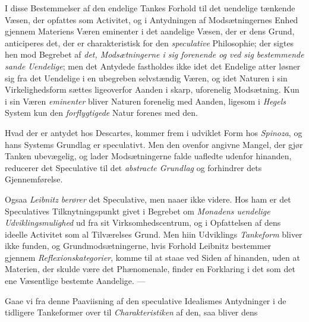 I disse Bestemmelser af den endelige Tankes Forhold til
det uendelige tænkende Væsen, der opfattes som Activitet, og i
Antydningen af Modsætningernes Enhed gjennem Materiens
Væren eminenter i det aandelige Væsen, der er dens Grund,
anticiperes det, der er charakteristisk for den \emph{speculative}
Philosophie; der sigtes hen mod Begrebet af \emph{det, Modsætningerne
i sig forenende og ved sig bestemmende
sande Uendelige}; men det Antydede fastholdes ikke idet
det Endelige atter løsner sig fra det Uendelige i en ubegreben
selvstændig Væren, og idet Naturen i sin Virkelighedsform
sættes ligeoverfor Aanden i skarp, uforenelig Modsætning. Kun
i sin Væren \emph{eminenter} bliver Naturen forenelig med Aanden,
ligesom i \emph{Hegels} System kun den \emph{forflygtigede} Natur forenes
med den.

Hvad der er antydet hos Descartes, kommer frem i udviklet
Form hos \emph{Spinoza}, og hans Systems Grundlag er speculativt.
Men den ovenfor angivne Mangel, der gjør Tanken
ubevægelig, og lader Modsætningerne falde uafledte udenfor
hinanden, reducerer det Speculative til det \emph{abstracte Grundlag}
og forhindrer dets Gjennemførelse.

Ogsaa \emph{Leibnitz berører} det Speculative, men naaer
ikke videre. Hos ham er det Speculatives Tilknytningspunkt
givet i Begrebet om \emph{Monadens uendelige Udviklingsmulighed}
ud fra sit Virksomhedscentrum, og i Opfattelsen af
dens ideelle Activitet som al Tilværelses Grund. Men hiin
Udviklings \emph{Tankeform} bliver ikke funden, og Grundmodsætningerne,
hvis Forhold Leibnitz bestemmer gjennem \emph{Reflexionskategorier},
komme til at staae ved Siden af hinanden,
uden at Materien, der skulde være det Phænomenale,
 finder en Forklaring i det som det ene Væsentlige bestemte
Aandelige. ---

Gaae vi fra denne Paaviisning af den speculative Idealismes
Antydninger i de tidligere Tankeformer over til \emph{Charakteristiken}
af den, saa bliver dens

